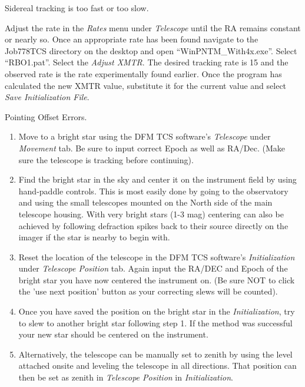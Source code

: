 \documentclass[letterpaper,12pt]{article}
\begin{document}
\begin{shaded}\centering
	Sidereal tracking is too fast or too slow.
\end{shaded}\noindent
Adjust the rate in the \textit{Rates} menu under \textit{Telescope} until the RA remains constant or nearly so. Once an appropriate rate has been found navigate to the Job778TCS directory on the desktop and open ``WinPNTM\_With4x.exe''. Select ``RBO1.pat''. Select the \textit{Adjust XMTR}. The desired tracking rate is 15 and the observed rate is the rate experimentally found earlier. Once the program has calculated the new XMTR value, substitute it for the current value and select \textit{Save Initialization File}.
\begin{shaded}\centering
	Pointing Offset Errors.
\end{shaded}\noindent
\begin{enumerate}
			\item Move to a bright star using the DFM TCS software's \textit{Telescope} under \textit{Movement} tab. Be sure to input correct Epoch as well as RA/Dec. (Make sure the telescope is tracking before continuing). 
			\item Find the bright star in the sky and center it on the instrument field by using hand-paddle controls. This is most easily done by going to the observatory and using the small telescopes mounted on the North side of the main telescope housing.  With very bright stars (1-3 mag) centering can also be achieved by following defraction spikes back to their source directly on the imager if the star is nearby to begin with.
			\item Reset the location of the telescope in the DFM TCS software's \textit{Initialization} under \textit{Telescope Position} tab. Again input the RA/DEC and Epoch of the bright star you have now centered the instrument on. (Be sure NOT to click the 'use next position' button as your correcting slews will be counted).
			\item Once you have saved the position on the bright star in the \textit{Initialization}, try to slew to another bright star following step 1.  If the method was successful your new star should be centered on the instrument.
			\item Alternatively, the telescope can be manually set to zenith by using the level attached onsite and leveling the telescope in all directions. That position can then be set as zenith in \textit{Telescope Position} in \textit{Initialization}.
		\end{enumerate}
\end{document}
